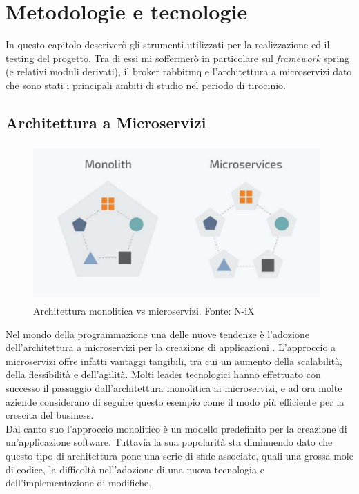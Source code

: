 \chapter{Metodologie e tecnologie}\label{teoria}

In questo capitolo descriverò gli strumenti utilizzati per la realizzazione ed il testing del progetto. Tra di essi mi soffermerò in particolare sul \textit{framework} \gls{spring} (e relativi moduli derivati), il broker \gls{rabbitmq} e l'architettura a microservizi dato che sono stati i principali ambiti di studio nel periodo di tirocinio.

\section{Architettura a Microservizi}

\begin{figure}[H]
    \centering
    \includegraphics[width=11cm, height=6cm]{images/monoVSmicro.pdf}
    \caption{Architettura monolitica vs microservizi. Fonte: N-iX}
\end{figure}

Nel mondo della programmazione una delle nuove tendenze è l'adozione dell'architettura a microservizi per la creazione di applicazioni \cite{monomicro}. L'approccio a microservizi offre infatti vantaggi tangibili, tra cui un aumento della scalabilità, della flessibilità e dell'agilità. Molti leader tecnologici hanno effettuato con successo il passaggio dall'architettura monolitica ai microservizi, e ad ora molte aziende considerano di seguire questo esempio come il modo più efficiente per la crescita del business.\\
Dal canto suo l'approccio monolitico è un modello predefinito per la creazione di un'applicazione software. Tuttavia la sua popolarità sta diminuendo dato che questo tipo di architettura pone una serie di sfide associate, quali una grossa mole di codice, la difficoltà nell'adozione di una nuova tecnologia e dell'implementazione di modifiche.


